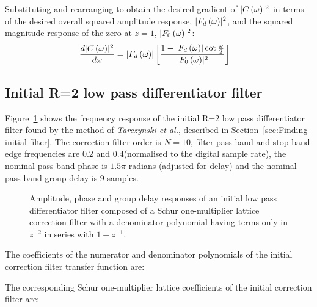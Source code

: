 \documentclass[a4paper,twoside,10pt,english]{article}
\newcommand{\DesignOfSchurLatticeFiltersPdfScale}{1}
\DeclarePairedDelimiter{\mathabs}{\lvert}{\rvert}
\begin{document}
Substituting and rearranging to obtain the desired gradient of
$\mathabs{C\left(\omega\right)}^{2}$ in terms of the desired overall squared
amplitude response, $\mathabs{F_{d}\left(\omega\right)}^{2}$, and the
squared magnitude response of the zero at $z=1$,
$\mathabs{F_{0}\left(\omega\right)}^{2}$:
\begin{align*}
  \frac{d\mathabs{C\left(\omega\right)}^{2}}{d\omega}
  &= \mathabs{F_{d}\left(\omega\right)}
\left[\frac{1-\mathabs{F_{d}\left(\omega\right)}\cot\frac{\omega}{2}}{\mathabs{F_{0}\left(\omega\right)}^{2} }\right]
\end{align*}

\subsection{Initial R=2 low pass differentiator filter}
Figure~\ref{fig:Schur-OneM-lattice-correction-lowpass-differentiator-R2-initial}
shows the frequency response of the initial R=2 low pass differentiator filter
found by the method of \emph{Tarczynski et al.}, described in
Section~\ref{sec:Finding-initial-filter}. The correction filter order is $N=10$,
filter pass band and stop band edge frequencies are $0.2$ and $0.4$\;(normalised
to the digital sample rate), the nominal pass band phase is $1.5\pi$
radians (adjusted for delay) and the nominal pass band group delay is $9$
samples.

\begin{figure}
\centering
\scalebox{\DesignOfSchurLatticeFiltersPdfScale}{}
\caption{Amplitude, phase and group delay responses of an initial 
  low pass differentiator filter composed of a Schur one-multiplier lattice
  correction filter with a denominator polynomial having terms only in $z^{-2}$
  in series with $1-z^{-1}$.}
\label{fig:Schur-OneM-lattice-correction-lowpass-differentiator-R2-initial}
\end{figure}

The coefficients of the numerator and denominator polynomials of the initial
correction filter transfer function are:
\begin{small}


\end{small}

The corresponding Schur one-multiplier lattice coefficients of the initial
correction filter are:
\begin{small}



\end{small}
\end{document}
